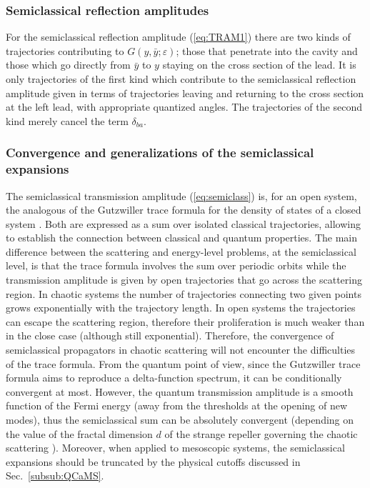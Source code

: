 \documentclass[a4paper,10pt]{article}
\begin{document}
\subsubsection{Semiclassical reflection amplitudes}
\label{subsub:sra}

For the semiclassical reflection amplitude (\ref{eq:TRAM1}) there are two kinds of trajectories contributing to $G(y,{\bar y};\varepsilon)$; those that penetrate into the cavity and those which go directly from ${\bar y}$ to $y$ staying on the cross section of the lead. It is only trajectories of the first kind which contribute to the semiclassical reflection amplitude given in terms of trajectories leaving and returning to the cross section at the left lead, with appropriate quantized angles. The trajectories of the second kind merely cancel the term $\delta_{ba}$.

\subsubsection{Convergence and generalizations of the semiclassical expansions}
\label{subsub:cgse}

The semiclassical transmission amplitude (\ref{eq:semiclass}) is, for an
open system, the analogous of the Gutzwiller trace formula for the
density of states of a closed system \cite{gutz_tracefor}. Both are expressed as a sum over isolated classical trajectories, allowing to establish the connection between classical and quantum properties. The main difference between the scattering and energy-level problems, at the semiclassical level, is that the trace formula involves the sum over periodic orbits while the transmission amplitude is given by open trajectories that go across the scattering region. In chaotic systems the number of trajectories connecting two given points grows exponentially with the trajectory length. In open systems the trajectories can escape the scattering region, therefore their proliferation is much weaker than in the close case (although still exponential). Therefore, the convergence of semiclassical propagators in chaotic scattering will not encounter the difficulties of the trace formula. From the quantum point of view, since the Gutzwiller trace formula aims to reproduce a delta-function spectrum, it can be conditionally convergent at most. However, the quantum transmission amplitude is a smooth function of the Fermi energy (away from the thresholds at the opening of new modes), thus the semiclassical sum can be absolutely convergent (depending on the value of the fractal dimension $d$ of the strange repeller governing the chaotic scattering \cite{Jen94}). 
Moreover, when applied to mesoscopic systems, the semiclassical expansions should be truncated by the physical cutoffs discussed in Sec.~\ref{subsub:QCaMS}.
\end{document}
